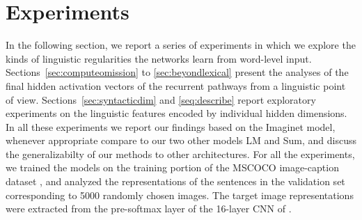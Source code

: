 \section{Experiments}
\label{sec:experiments}


In the following section, we report a series of experiments in which
we explore the kinds of linguistic regularities the networks learn from
word-level input. Sections~\ref{sec:computeomission} to \ref{sec:beyondlexical} 
present the analyses of the final hidden activation 
vectors of the recurrent pathways from a linguistic point of view. 
Sections~\ref{sec:syntacticdim} and \ref{seq:describe} report exploratory experiments on
the linguistic features encoded by individual hidden dimensions. 
In all these experiments we report our findings based on the {\sc Imaginet}
model, whenever appropriate compare to our two other models {\sc LM} and {\sc Sum}, 
and discuss the generalizabilty of our methods to other architectures.
\label{edit:experimentsgeneral}
For all the experiments, we trained the models on the training portion of the
MSCOCO image-caption dataset \cite{lin2014microsoft}, and analyzed the
representations of the sentences in the validation set corresponding
to 5000 randomly chosen images. The target image representations were
extracted from the pre-softmax layer of the 16-layer CNN of
.






